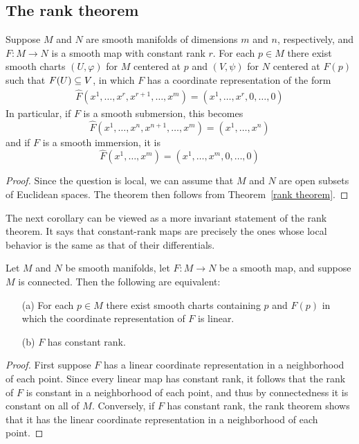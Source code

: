 \subsection{The rank theorem}
\begin{theorem}
Suppose $M$ and $N$ are smooth manifolds of dimensions $m$ and $n$, respectively, and $F:M\to N$ is a smooth map with constant rank $r$. For each $p\in M$ there exist smooth charts $(U,\varphi)$ for $M$ centered at $p$ and $(V,\psi)$ for $N$ centered at $F(p)$ such that $F(U)\subseteq V$, in which $F$ has a coordinate representation of the form
\begin{align}\label{Rank thm mani-1}
\widehat{F}(x^1,\dots,x^r,x^{r+1},\dots,x^m)=(x^1,\dots,x^r,0,\dots,0)
\end{align}
In particular, if $F$ is a smooth submersion, this becomes
\[\widehat{F}(x^1,\dots,x^n,x^{n+1},\dots,x^m)=(x^1,\dots,x^n)\]
and if $F$ is a smooth immersion, it is
\[\widehat{F}(x^1,\dots,x^m)=(x^1,\dots,x^m,0,\dots,0)\]
\end{theorem}
\begin{proof}
Since the question is local, we can assume that $M$ and $N$ are open subsets of Euclidean spaces. The theorem then follows from Theorem~\ref{rank theorem}.
\end{proof}
The next corollary can be viewed as a more invariant statement of the rank theorem. It says that constant-rank maps are precisely the ones whose local behavior is the same as that of their differentials.
\begin{corollary}
Let $M$ and $N$ be smooth manifolds, let $F:M\to N$ be a smooth map, and suppose $M$ is connected. Then the following are equivalent:
\begin{itemize}
\item[(a)]For each $p\in M$ there exist smooth charts containing $p$ and $F(p)$ in which the coordinate representation of $F$ is linear.
\item[(b)]$F$ has constant rank.
\end{itemize}
\end{corollary}
\begin{proof}
First suppose $F$ has a linear coordinate representation in a neighborhood of each point. Since every linear map has constant rank, it follows that the rank of $F$ is
constant in a neighborhood of each point, and thus by connectedness it is constant
on all of $M$. Conversely, if $F$ has constant rank, the rank theorem shows that it has the linear coordinate representation in a neighborhood of each point.
\end{proof}

